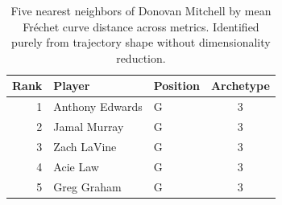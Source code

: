 \begin{table}[htbp]
  \centering\small
  \begin{tabular}{rllc}
    \toprule
    Rank & Player & Position & Archetype \\
    \midrule
    1 & Anthony Edwards & G & 3 \\
    2 & Jamal Murray & G & 3 \\
    3 & Zach LaVine & G & 3 \\
    4 & Acie Law & G & 3 \\
    5 & Greg Graham & G & 3 \\
    \bottomrule
  \end{tabular}
  \caption{Five nearest neighbors of Donovan Mitchell by mean Fr\'{e}chet curve distance across metrics. Identified purely from trajectory shape without dimensionality reduction.}
  \label{tab:Donovan_Mitchell_frechet_curve_neighbors}
\end{table}

